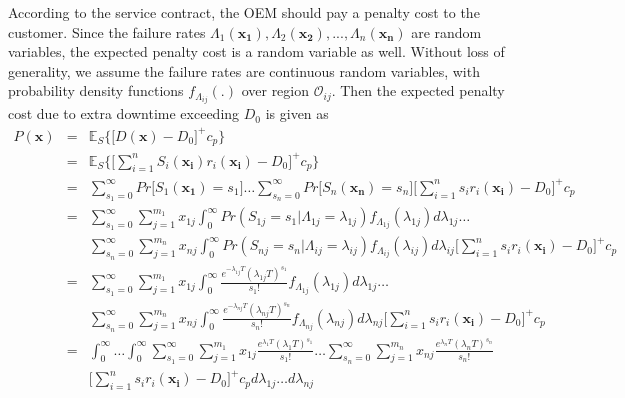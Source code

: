 \documentclass[preprint,12pt]{elsarticle}
\begin{document}
According to the service contract, the OEM should pay a penalty cost to the customer. Since the failure rates $\Lambda_{1}(\boldsymbol{x_{1}}),\Lambda_{2}(\boldsymbol{x_{2}}),...,\Lambda_{n}(\boldsymbol{x_{n}})$ are random variables, the expected penalty cost is a random variable as well. Without loss of generality, we assume the failure rates are continuous random variables, with probability density functions $f_{\Lambda_{ij}}(.)$ over region $\mathcal{O}_{ij}$. Then the expected penalty cost due to extra downtime exceeding $D_{0}$ is given as
\begin{eqnarray}
P(\boldsymbol{x})& = & \mathbb{E}_{S}\bigg\{\bigg[D(\boldsymbol{x})-D_{0}\bigg]^{+} c_{p} \bigg\} \nonumber\\
&=& \mathbb{E}_{S}\bigg\{\bigg[\sum_{i=1}^{n}{S_{i}(\boldsymbol{x_{i}})r_{i}(\boldsymbol{x_i})}-D_{0}\bigg]^{+} c_{p} \bigg\} \nonumber\\
&=&\sum_{s_{1}=0}^{\infty}{Pr\bigg[S_{1}(\boldsymbol{x_{1}})=s_{1}\bigg]}\dots\sum_{s_{n}=0}^{\infty}{Pr\bigg[S_{n}(\boldsymbol{x_{n}})=s_{n}\bigg]} \bigg[\sum_{i=1}^{n}{s_{i}r_{i}(\boldsymbol{x_{i}})}-D_{0}\bigg]^{+}c_{p} \nonumber\\
&=&\sum^{\infty}_{s_{1}=0}\sum^{m_{1}}_{j=1}{x_{1j}}\int^{\infty}_{0}{Pr(S_{1j}=s_{1}|\Lambda_{1j}=\lambda_{1j})f_{\Lambda_{1j}}(\lambda_{1j})d\lambda_{1j}}\dots \nonumber\\
&&\sum^{\infty}_{s_{n}=0}\sum^{m_{n}}_{j=1}{x_{nj}}\int^{\infty}_{0}{Pr(S_{nj}=s_{n}|\Lambda_{ij}=\lambda_{ij})f_{\Lambda_{ij}}(\lambda_{ij})d\lambda_{ij}}\bigg[\sum_{i=1}^{n}{s_{i}r_{i}(\boldsymbol{x_{i}})}-D_{0}\bigg]^{+}c_{p} \nonumber\\
&=& \sum^{\infty}_{s_{1}=0}\sum^{m_{1}}_{j=1}{x_{1j}}\int^{\infty}_{0}{\frac{e^{-\lambda_{1j}T}(\lambda_{1j}T)^{s_{1}}}{s_{1}!}f_{\Lambda_{1j}}(\lambda_{1j})d\lambda_{1j}}\dots \nonumber\\
&&\sum^{\infty}_{s_{n}=0}\sum^{m_{n}}_{j=1}{x_{nj}}\int^{\infty}_{0}{\frac{e^{-\lambda_{nj}T}(\lambda_{nj}T)^{s_{n}}}{s_{n}!}f_{\Lambda_{nj}}(\lambda_{nj})d\lambda_{nj}}\bigg[\sum_{i=1}^{n}{s_{i}r_{i}(\boldsymbol{x_{i}})}-D_{0}\bigg]^{+}c_{p} \nonumber\\
&=&\int^{\infty}_{0}\dots\int^{\infty}_{0}{\sum_{s_{1}=0}^{\infty}\sum^{m_{1}}_{j=1}{x_{1j}\frac{e^{\lambda_{1}T}(\lambda_{1}T)^{s_{1}}}{s_{1}!}\dots \sum_{s_{n}=0}^{\infty}\sum^{m_{n}}_{j=1}{x_{nj}\frac{e^{\lambda_{n}T}(\lambda_{n}T)^{s_{n}}}{s_{n}!}}}}\nonumber\\
&&\bigg[\sum_{i=1}^{n}{s_{i}r_{i}(\boldsymbol{x_{i}})}-D_{0}\bigg]^{+}c_{p}d\lambda_{1j}\dots d\lambda_{nj}
\end{eqnarray}
\end{document}
